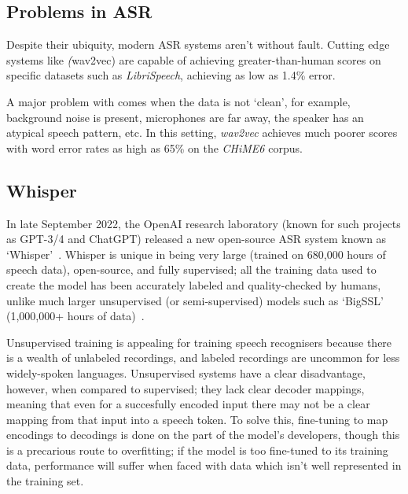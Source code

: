 \subsection{Problems in ASR}

Despite their ubiquity, modern ASR systems aren't without fault.
Cutting edge systems like \emph(wav2vec) are capable of achieving greater-than-human scores on specific datasets\cite{wav2vec2,bigssl,chung2021} such as \emph{LibriSpeech}\cite{librispeech}, achieving as low as 1.4\% error\cite{zhang2020}.

A major problem with comes when the data is not `clean', for example, background noise is present, microphones are far away, the speaker has an atypical speech pattern, etc. 
In this setting, \emph{wav2vec} achieves much poorer scores with word error rates as high as 65\%\cite{whisper} on the \emph{CHiME6} corpus\cite{chime6}.


\subsection{Whisper}

In late September 2022, the OpenAI research laboratory (known for such projects as GPT-3/4 and ChatGPT) released a new open-source ASR system known as `Whisper'~\cite{whisper}.
Whisper is unique in being very large (trained on 680,000 hours of speech data), open-source, and fully supervised;
all the training data used to create the model has been accurately labeled and quality-checked by humans, unlike much larger unsupervised (or semi-supervised) models such as `BigSSL' (1,000,000+ hours of data)~\cite{bigssl}.

Unsupervised training is appealing for training speech recognisers because there is a wealth of unlabeled recordings, and labeled recordings are uncommon for less widely-spoken languages\cite{baevski2021}.
Unsupervised systems have a clear disadvantage, however, when compared to supervised; they lack clear decoder mappings\cite{whisper}, meaning that even for a succesfully encoded input there may not be a clear mapping from that input into a speech token.
To solve this, fine-tuning to map encodings to decodings is done on the part of the model's developers, though this is a precarious route to overfitting;
if the model is too fine-tuned to its training data, performance will suffer when faced with data which isn't well represented in the training set.


